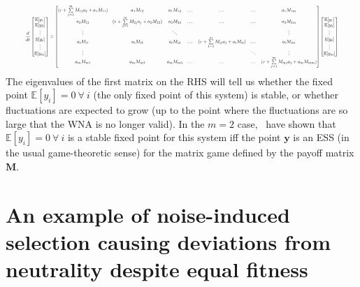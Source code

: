 \begin{equation}
\resizebox{0.93\textwidth}{!}{$\displaystyle
	\frac{d}{dt}\begin{bmatrix}
	\mathbb{E}[y_1]\\
	\mathbb{E}[y_2]\\
	\vdots\\
	\mathbb{E}[y_i]\\
	\vdots\\
	\mathbb{E}[y_m]
	\end{bmatrix}
	=
	\begin{bmatrix}
	(r + \sum\limits_{j=1}^{m}M_{1j}a_j + a_1M_{11}) & a_1M_{12} & a_1M_{13} & \dots & \dots & \dots & a_1M_{1m}\\
	a_2M_{21} & (r + \sum\limits_{j=1}^{m}M_{2j}a_j + a_2M_{22}) & a_2M_{23} & \dots & \dots & \dots & a_2M_{2m}\\
	\vdots &  & \ddots & &  & & \vdots\\
	a_{i}M_{i1} & a_iM_{i2} & a_iM_{i3} & \dots & (r + \sum\limits_{j=1}^{m}M_{ij}a_j + a_iM_{ii}) & \dots & a_iM_{im}\\
	\vdots &  &  & & & \ddots & \vdots\\
	a_mM_{m1} & a_mM_{m2} & a_mM_{m3} & \dots & \dots & \dots & (r + \sum\limits_{j=1}^{m}M_{mj}a_j + a_mM_{mm})
	\end{bmatrix}
	\begin{bmatrix}
	\mathbb{E}[y_1]\\
	\mathbb{E}[y_2]\\
	\vdots\\
	\mathbb{E}[y_i]\\
	\vdots\\
	\mathbb{E}[y_m]
	\end{bmatrix}
	$}
\end{equation}
The eigenvalues of the first matrix on the RHS will tell us whether the fixed point $\mathbb{E}[y_i] = 0 \ \forall \ i$ (the only fixed point of this system) is stable, or whether fluctuations are expected to grow (up to the point where the fluctuations are so large that the WNA is no longer valid). In the $m=2$ case,~\cite{tao_stochastic_2007} have shown that $\mathbb{E}[y_i] = 0 \ \forall \ i$ is a stable fixed point for this system iff the point $\mathbf{y}$ is an ESS (in the usual game-theoretic sense) for the matrix game defined by the payoff matrix $\mathbf{M}$.

\section{An example of noise-induced selection causing deviations from neutrality despite equal fitness}\label{App_deviation_from_neutrality}

